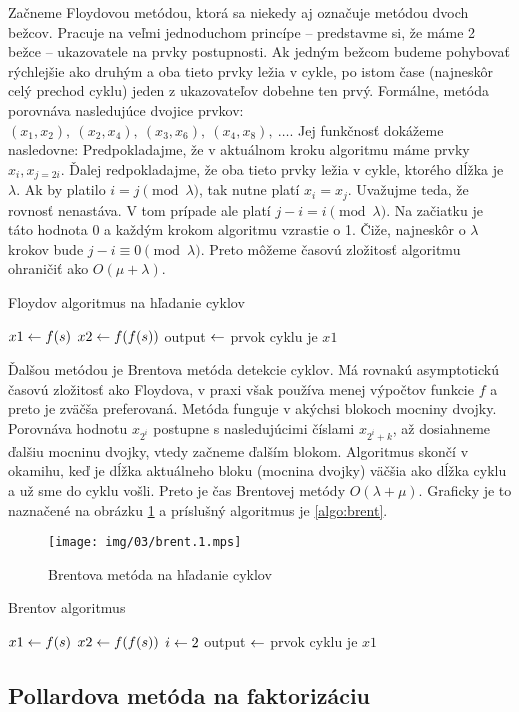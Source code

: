 Začneme Floydovou metódou, ktorá sa niekedy aj označuje metódou dvoch
bežcov. Pracuje na veľmi jednoduchom princípe -- predstavme si, že máme
2 bežce -- ukazovatele na prvky postupnosti. Ak jedným bežcom budeme
pohybovať rýchlejšie ako druhým a oba tieto prvky ležia v cykle, po
istom čase (najneskôr celý prechod cyklu) jeden z ukazovateľov dobehne
ten prvý. Formálne, metóda porovnáva nasledujúce dvojice prvkov:
$(x_1,x_2),\ (x_2,x_4),\ (x_3,x_6),\ (x_4,x_8),\ \dots$.
Jej funkčnosť dokážeme nasledovne: Predpokladajme, že v aktuálnom
kroku algoritmu máme prvky $x_i, x_{j=2i}$. Ďalej redpokladajme,
že oba tieto prvky ležia v cykle, ktorého dĺžka je $\lambda$.
Ak by platilo $i = j \pmod{\lambda}$, tak nutne platí $x_i = x_j$.
Uvažujme teda, že rovnosť nenastáva. V tom prípade ale platí 
$j-i = i \pmod{\lambda}$. Na začiatku je táto hodnota 0 
a každým krokom algoritmu vzrastie o 1. Čiže,
najneskôr o $\lambda$ krokov bude $j-i \equiv 0 \pmod{\lambda}$.
Preto môžeme časovú zložitosť algoritmu ohraničiť ako $O(\mu+\lambda)$.

\begin{algorithm}
    \caption{Floydov algoritmus na hľadanie cyklov}
    \label{algo:floyd}
    $x1 \leftarrow f(s)$\;
    $x2 \leftarrow f(f(s))$\;
    output $\leftarrow$ prvok cyklu je $x1$\;
\end{algorithm}

\medskip
Ďalšou metódou je Brentova metóda detekcie cyklov. Má rovnakú
asymptotickú časovú zložitosť ako Floydova, v praxi však používa menej
výpočtov funkcie $f$ a preto je zväčša preferovaná.
Metóda funguje v akýchsi blokoch mocniny dvojky.
Porovnáva hodnotu $x_{2^i}$ postupne s nasledujúcimi číslami
$x_{2^i+k}$, až dosiahneme ďalšiu mocninu dvojky, vtedy začneme ďalším
blokom. Algoritmus skončí v okamihu, keď je dĺžka aktuálneho bloku
(mocnina dvojky) väčšia ako dĺžka cyklu a už sme do cyklu vošli.
Preto je čas Brentovej metódy $O(\lambda + \mu)$.
Graficky je to naznačené na obrázku \ref{fig:brent} a príslušný
algoritmus je \ref{algo:brent}.

\begin{figure}[h!]
    \centering
    \texttt{[image: img/03/brent.1.mps]}
    \caption{Brentova metóda na hľadanie cyklov}
    \label{fig:brent}
\end{figure}

\begin{algorithm}
    \caption{Brentov algoritmus}
    \label{algo:brent}
    $x1 \leftarrow f(s)$\;
    $x2 \leftarrow f(f(s))$\;
    $i \leftarrow 2$\;
    output $\leftarrow$ prvok cyklu je $x1$\;
\end{algorithm}

\subsection{Pollardova metóda na faktorizáciu}
